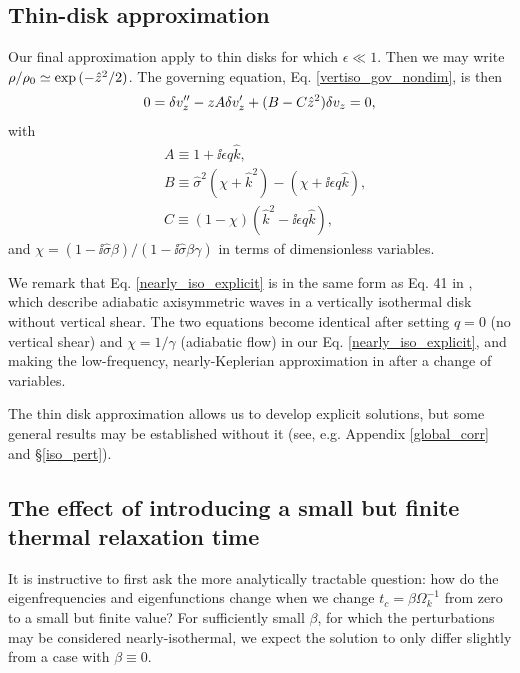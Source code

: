 \subsection{Thin-disk approximation}\label{analytic_relax}
Our final approximation apply to thin disks for 
which $\epsilon\ll 1$. Then we may write $\rho/\rho_0\simeq
\exp{(-\hat{z}^2/2)}$. The governing equation,
Eq. \ref{vertiso_gov_nondim}, is then   
\begin{align}
  0 = \delta v_z^{\prime\prime} - z A\delta v_z^\prime +
  (B - C\hat{z}^2)\delta v_z = 0,\label{nearly_iso_explicit}
\end{align}
with
\begin{align}
  &A \equiv 1 + \ii \epsilon q \hat{k},\\
  &B \equiv \hat{\sigma}^2\left(\chi + \hat{k}^2\right) -
  \left(\chi + \ii \epsilon q \hat{k}\right),\\
  &C \equiv \left(1-\chi\right)\left(\hat{k}^2 - \ii
    \epsilon q\hat{k}\right), 
\end{align}
and $\chi =
\left(1-\ii\hat{\sigma}\beta\right)/\left(1-\ii\hat{\sigma}\beta\gamma\right)
$ in terms of dimensionless variables. 

We remark that Eq. \ref{nearly_iso_explicit} is in the same 
form as Eq. 41 in \cite{lubow93}, which describe adiabatic axisymmetric waves in
a vertically isothermal disk without vertical shear. The two equations
become identical after  setting $q=0$ (no vertical shear) and
$\chi=1/\gamma$ (adiabatic flow) in our Eq. \ref{nearly_iso_explicit},
and making the low-frequency, nearly-Keplerian approximation in
\citeauthor{lubow93} after a change of variables.    

The thin disk approximation allows us to develop explicit solutions,
but some general results may be established without it (see,
e.g. Appendix \ref{global_corr} and \S\ref{iso_pert}).     


\subsection{The effect of introducing a small but finite
  thermal relaxation time}\label{relax_pert}
It is instructive to first ask  the more analytically tractable
question: how 
do the eigenfrequencies and eigenfunctions change when we change
$t_c=\beta\Omega_k^{-1}$ from zero to a small but finite value? For
sufficiently small $\beta$, for which the perturbations may be 
considered nearly-isothermal, we expect the solution to only
differ slightly from a case with $\beta\equiv 0$. 

